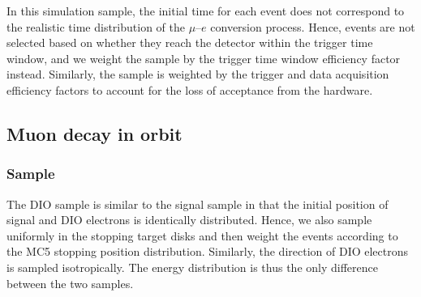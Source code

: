 
In this simulation sample, the initial time for each event does not correspond
to the realistic time distribution of the $\mu$--$e$ conversion process. Hence,
events are not selected based on whether they reach the detector within the
trigger time window, and we weight the sample by the trigger time window
efficiency factor instead. Similarly, the sample is weighted by the trigger and
data acquisition efficiency factors to account for the loss of acceptance from
the hardware.


\subsection{Muon decay in orbit}
\subsubsection{Sample}
The DIO sample is similar to the signal sample in that the initial position
of signal and DIO electrons is identically distributed. Hence, we also sample
uniformly in the stopping target disks and then weight the events according to
the MC5 stopping position distribution. Similarly, the direction of DIO
electrons is sampled isotropically. The energy distribution is thus the only
difference between the two samples. 

